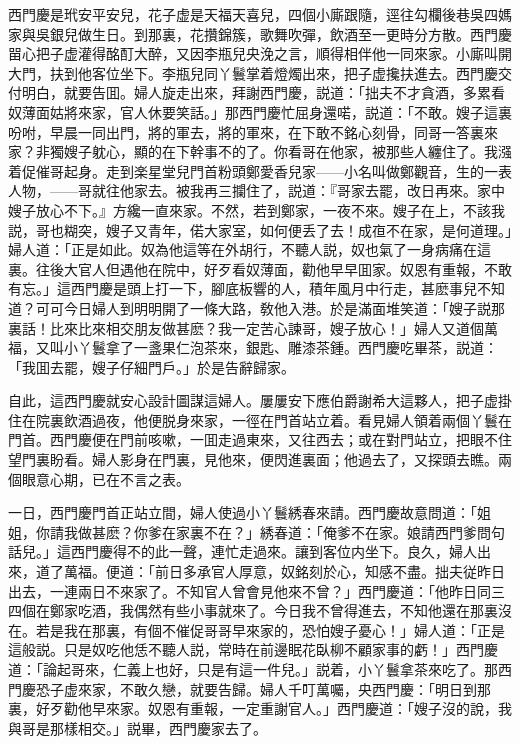 西門慶是玳安平安兒，花子虚是天福天喜兒，四個小廝跟隨，逕往勾欄後巷吳四媽家與吳銀兒做生日。到那裏，花攢錦簇，歌舞吹彈，飲酒至一更時分方散。西門慶㽞心把子虚灌得酩酊大醉，又因李瓶兒央浼之言，順得相伴他一同來家。小廝叫開大門，扶到他客位坐下。李瓶兒同丫鬟掌着燈燭出來，把子虚攙扶進去。西門慶交付明白，就要告囬。婦人旋走出來，拜謝西門慶，説道：「拙夫不才貪酒，多累看奴薄面姑將來家，官人休要笑話。」那西門慶忙屈身還喏，説道：「不敢。嫂子這裏吩咐，早晨一同出門，將的軍去，將的軍來，在下敢不銘心刻骨，同哥一答裏來家？非獨嫂子躭心，顯的在下幹事不的了。你看哥在他家，被那些人纏住了。我漒着促催哥起身。走到楽星堂兒門首粉頭鄭愛香兒家——小名叫做鄭觀音，生的一表人物，——哥就往他家去。被我再三攔住了，説道：『哥家去罷，改日再來。家中嫂子放心不下。』方纔一直來家。不然，若到鄭家，一夜不來。嫂子在上，不該我説，哥也糊突，嫂子又青年，偌大家室，如何便丢了去！成亱不在家，是何道理。」婦人道：「正是如此。奴為他這等在外胡行，不聽人説，奴也氣了一身病痛在這裏。往後大官人但遇他在院中，好歹看奴薄面，勸他早早囬家。奴恩有重報，不敢有忘。」這西門慶是頭上打一下，腳底板響的人，積年風月中行走，甚麽事兒不知道？可可今日婦人到明明開了一條大路，敎他入港。於是滿面堆笑道：「嫂子説那裏話！比來比來相交朋友做甚麽？我一定苦心諫哥，嫂子放心！」婦人又道個萬福，又叫小丫鬟拿了一盞果仁泡茶來，銀匙、雕漆茶鍾。西門慶吃畢茶，説道：「我囬去罷，嫂子仔細門戶。」於是告辭歸家。

自此，這西門慶就安心設計圖謀這婦人。屢屢安下應伯爵謝希大這夥人，把子虚掛住在院裏飲酒過夜，他便脱身來家，一徑在門首站立着。看見婦人領着兩個丫鬟在門首。西門慶便在門前咳嗽，一囬走過東來，又往西去；或在對門站立，把眼不住望門裏盼看。婦人影身在門裏，見他來，便閃進裏面；他過去了，又探頭去瞧。兩個眼意心期，已在不言之表。

一日，西門慶門首正站立間，婦人使過小丫鬟綉春來請。西門慶故意問道：「姐姐，你請我做甚麽？你爹在家裏不在？」綉春道：「俺爹不在家。娘請西門爹問句話兒。」這西門慶得不的此一聲，連忙走過來。讓到客位内坐下。良久，婦人出來，道了萬福。便道：「前日多承官人厚意，奴銘刻於心，知感不盡。拙夫従昨日出去，一連兩日不來家了。不知官人曾會見他來不曾？」西門慶道：「他昨日同三四個在鄭家吃酒，我偶然有些小事就來了。今日我不曾得進去，不知他還在那裏沒在。若是我在那裏，有個不催促哥哥早來家的，恐怕嫂子憂心！」婦人道：「正是這般説。只是奴吃他恁不聽人説，常時在前邊眠花臥柳不顧家事的虧！」西門慶道：「論起哥來，仁義上也好，只是有這一件兒。」説着，小丫鬟拿茶來吃了。那西門慶恐子虚來家，不敢久戀，就要告歸。婦人千叮萬囑，央西門慶：「明日到那裏，好歹勸他早來家。奴恩有重報，一定重謝官人。」西門慶道：「嫂子沒的說，我與哥是那樣相交。」説畢，西門慶家去了。

